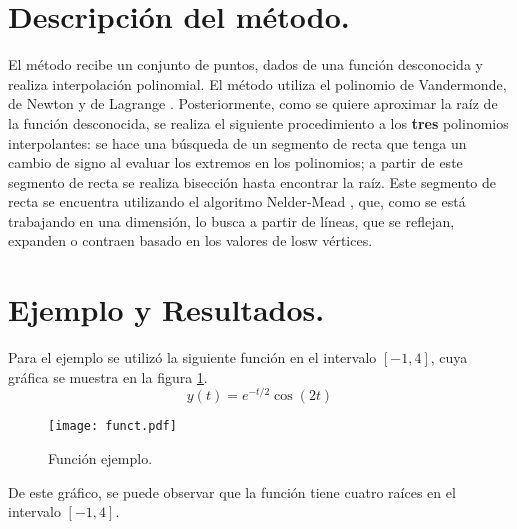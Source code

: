 \maketitle
\section{Descripción del método.}
El método recibe un conjunto de puntos, dados de una función desconocida y realiza interpolación polinomial. El método utiliza el polinomio de Vandermonde, de Newton y de Lagrange \cite{interp}. Posteriormente, como se quiere aproximar la raíz de la función desconocida, se realiza el siguiente procedimiento a los \textbf{tres} polinomios interpolantes: se hace una búsqueda de un segmento de recta que tenga un cambio de signo al evaluar los extremos en los polinomios; a partir de este segmento de recta se realiza bisección hasta encontrar la raíz. Este segmento de recta se encuentra utilizando el algoritmo Nelder-Mead \cite{Singer2009}, que, como se está trabajando en una dimensión, lo busca a partir de líneas, que se reflejan, expanden o contraen basado en los valores de losw vértices.

\section{Ejemplo y Resultados.}
Para el ejemplo se utilizó la siguiente función en el intervalo $[-1,4]$, cuya gráfica se muestra en la figura \ref{fig:example}.
\begin{equation}
    y(t) = e^{-t/2}\cos(2t)
\end{equation}
\begin{figure}[H]
    \centering
    \texttt{[image: funct.pdf]}
    \caption{Función ejemplo.}
    \label{fig:example}
\end{figure}
De este gráfico, se puede observar que la función tiene cuatro raíces en el intervalo $[-1,4]$.

